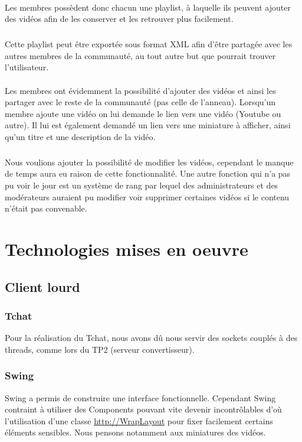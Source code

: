 \documentclass{article}
\begin{document}
\paragraph{}Les membres possèdent donc chacun une playlist, à laquelle ils peuvent ajouter des vidéos afin de les conserver et les retrouver plus facilement.
\subparagraph{}Cette playlist peut \^etre exportée sous format XML afin d'\^etre partagée avec les autres membres de la communauté, au tout autre but que pourrait trouver l'utilisateur.

\paragraph{}Les membres ont évidemment la possibilité d'ajouter des vidéos et ainsi les partager avec le reste de la communauté (pas celle de l'anneau). Lorsqu'un membre ajoute une vidéo on lui demande le lien vers une vidéo (Youtube ou autre). Il lui est également demandé un lien vers une miniature à afficher, ainsi qu'un titre et une description de la vidéo.
\subparagraph{}Nous voulions ajouter la possibilité de modifier les vidéos, cependant le manque de temps aura eu raison de cette fonctionnalité. Une autre fonction qui n'a pas pu voir le jour est un système de rang par lequel des administrateurs et des modérateurs auraient pu modifier voir supprimer certaines vidéos si le contenu n'était pas convenable.


\section{Technologies mises en oeuvre}

\subsection{Client lourd}

\subsubsection{Tchat}
Pour la réalisation du Tchat, nous avons dû nous servir des sockets couplés à des threads, comme lors du TP2 (serveur convertisseur).

\subsubsection{Swing}
Swing a permis de construire une interface fonctionnelle. Cependant Swing contraint à utiliser des Components pouvant vite devenir incontrôlables d'où l'utilisation d'une classe \href{http://tips4java.wordpress.com/2008/11/06/wrap-layout/}{http://WrapLayout}
pour fixer facilement certains éléments sensibles. Nous pensons notamment aux miniatures des vidéos.
\end{document}
